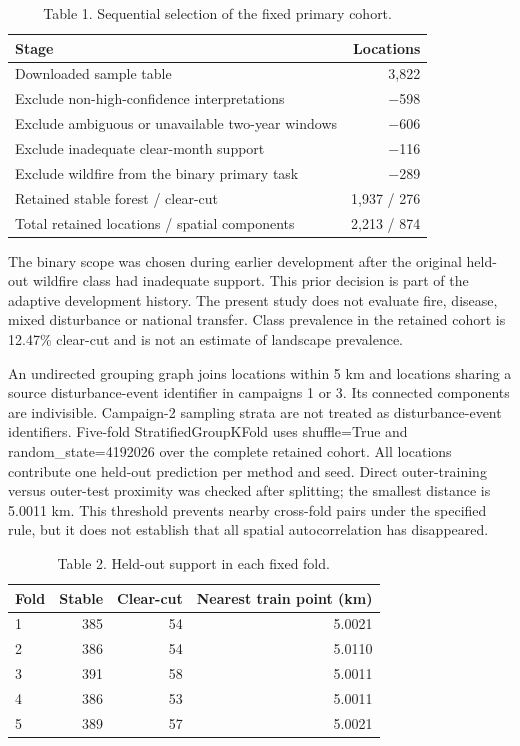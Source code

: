 \documentclass[11pt,a4paper]{article}
\begin{document}
\begin{table}[htbp]
\centering

\caption{Table 1. Sequential selection of the fixed primary cohort.}
\begin{tabular}{lr}
\toprule
Stage & Locations \\ \midrule
Downloaded sample table & 3,822 \\
Exclude non-high-confidence interpretations & $-$598 \\
Exclude ambiguous or unavailable two-year windows & $-$606 \\
Exclude inadequate clear-month support & $-$116 \\
Exclude wildfire from the binary primary task & $-$289 \\
Retained stable forest / clear-cut & 1,937 / 276 \\
Total retained locations / spatial components & 2,213 / 874 \\
\bottomrule
\end{tabular}
\end{table}

The binary scope was chosen during earlier development after the original held-out wildfire class had inadequate support. This prior decision is part of the adaptive development history. The present study does not evaluate fire, disease, mixed disturbance or national transfer. Class prevalence in the retained cohort is 12.47\% clear-cut and is not an estimate of landscape prevalence.

An undirected grouping graph joins locations within 5 km and locations sharing a source disturbance-event identifier in campaigns 1 or 3. Its connected components are indivisible. Campaign-2 sampling strata are not treated as disturbance-event identifiers. Five-fold StratifiedGroupKFold uses shuffle=True and random\_state=4192026 over the complete retained cohort. All locations contribute one held-out prediction per method and seed. Direct outer-training versus outer-test proximity was checked after splitting; the smallest distance is 5.0011 km. This threshold prevents nearby cross-fold pairs under the specified rule, but it does not establish that all spatial autocorrelation has disappeared.

\begin{table}[htbp]
\centering

\caption{Table 2. Held-out support in each fixed fold.}
\begin{tabular}{lrrr}
\toprule
Fold & Stable & Clear-cut & Nearest train point (km) \\ \midrule
1 & 385 & 54 & 5.0021 \\
2 & 386 & 54 & 5.0110 \\
3 & 391 & 58 & 5.0011 \\
4 & 386 & 53 & 5.0011 \\
5 & 389 & 57 & 5.0021 \\
\bottomrule
\end{tabular}
\end{table}
\end{document}
